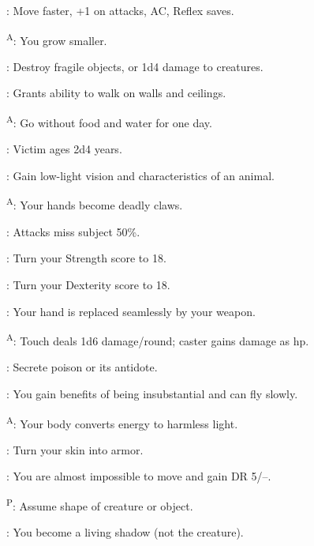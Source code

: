 \begin{enumerate*}
      : Move faster, +1 on attacks, AC, Reflex saves.

      \textsuperscript{A}: You grow smaller. %

      : Destroy fragile objects, or 1d4 damage to creatures.

      : Grants ability to walk on walls and ceilings.

      \textsuperscript{A}: Go without food and water for one day. %

\item {}: Victim ages 2d4 years.

      : Gain low-light vision and characteristics of an animal.

      \textsuperscript{A}: Your hands become deadly claws. %

      : Attacks miss subject 50\%.

      : Turn your Strength score to 18.

      : Turn your Dexterity score to 18.

      : Your hand is replaced seamlessly by your weapon. %

      \textsuperscript{A}: Touch deals 1d6 damage/round; caster gains damage as hp.

      : Secrete poison or its antidote.

\item {}: You gain benefits of being insubstantial and can fly slowly. %

      \textsuperscript{A}: Your body converts energy to harmless light.

      : Turn your skin into armor.

\item {}: You are almost impossible to move and gain DR 5/--.

      \textsuperscript{P}: Assume shape of creature or object. %

      : You become a living shadow (not the creature). %


\end{enumerate*}
